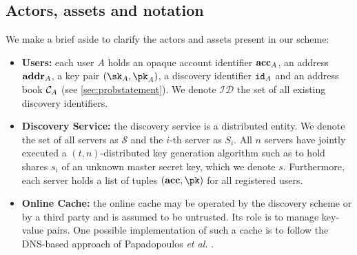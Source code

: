 	\subsection{Actors, assets and notation}
	
		\noindent We make a brief aside to clarify the actors and assets present in our scheme:		
		\begin{itemize}
			\item \textbf{Users:} each user $A$ holds an opaque account identifier $\mathbf{acc}_A$, an address $\mathbf{addr}_A$, a key pair $(\sk_A,\pk_A)$, a discovery identifier $\mathtt{id}_A$ and an address book $\mathcal{C}_{A}$ (see \autoref{sec:probstatement}). We denote $\mathcal{ID}$ the set of all existing discovery identifiers.
			\item \textbf{Discovery Service:} the discovery service is a distributed entity. We denote the set of all servers as $\mathcal{S}$ and the $i$-th server as $S_i$. All $n$ servers have jointly executed a $(t,n)$-distributed key generation algorithm such as to hold shares $s_i$ of an unknown master secret key, which we denote $s$. Furthermore, each server holds a list of tuples $(\acc, \pk)$ for all registered users.
			\item \textbf{Online Cache:} the online cache may be operated by the discovery scheme or by a third party and is assumed to be untrusted. Its role is to manage key-value pairs. One possible implementation of such a cache is to follow the DNS-based approach of Papadopoulos \textit{et al.} \cite{Papadopoulos18}.
			
			\end{itemize}
			
